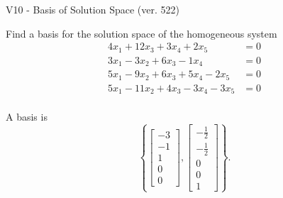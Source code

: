 \begin{exercise}
  \begin{exerciseTitle}V10 - Basis of Solution Space (ver. 522)\end{exerciseTitle}
  \begin{exerciseStatement}
    Find a basis for the solution space of the homogeneous system 
\begin{align*}
 4 x_ 1 + 12 x_ 3 + 3 x_ 4 + 2 x_ 5 &= 0  \\ 
  3 x_ 1 -3 x_ 2 + 6 x_ 3 -1 x_ 4 &= 0  \\ 
  5 x_ 1 -9 x_ 2 + 6 x_ 3 + 5 x_ 4 -2 x_ 5 &= 0  \\ 
  5 x_ 1 -11 x_ 2 + 4 x_ 3 -3 x_ 4 -3 x_ 5 &= 0  \\ 
 \end{align*}


 
  \end{exerciseStatement}

  \begin{exerciseAnswer}
   A basis is   
\[\left\{\left[\begin{array}{c}
-3 \\
-1 \\
1 \\
0 \\
0
\end{array}\right] , \left[\begin{array}{c}
-\frac{1}{2} \\
-\frac{1}{2} \\
0 \\
0 \\
1
\end{array}\right]\right\}.\]

  


  \end{exerciseAnswer}
\end{exercise}